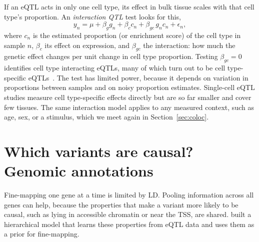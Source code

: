 If an eQTL acts in only one cell type, its effect in bulk tissue scales with that cell type's proportion. An \emph{interaction QTL} test looks for this,
\begin{equation}
  y_n = \mu + \beta_g g_n + \beta_c c_n + \beta_{gc}\,g_n c_n + \epsilon_n,
  \label{eq:ieqtl}
\end{equation}
where $c_n$ is the estimated proportion (or enrichment score) of the cell type in sample $n$, $\beta_c$ its effect on expression, and $\beta_{gc}$ the interaction: how much the genetic effect changes per unit change in cell type proportion. Testing $\beta_{gc}=0$ identifies cell type interacting eQTLs, many of which turn out to be cell type-specific eQTLs~\citep{kimhellmuth2020}. The test has limited power, because it depends on variation in proportions between samples and on noisy proportion estimates. Single-cell eQTL studies measure cell type-specific effects directly but are so far smaller and cover few tissues. The same interaction model applies to any measured context, such as age, sex, or a stimulus, which we meet again in Section~\ref{sec:coloc}.

\section{Which variants are causal? Genomic annotations}
\label{sec:annotations}

Fine-mapping one gene at a time is limited by LD. Pooling information across all genes can help, because the properties that make a variant more likely to be causal, such as lying in accessible chromatin or near the TSS, are shared. \citet{gaffney2012} built a hierarchical model that learns these properties from eQTL data and uses them as a prior for fine-mapping.

